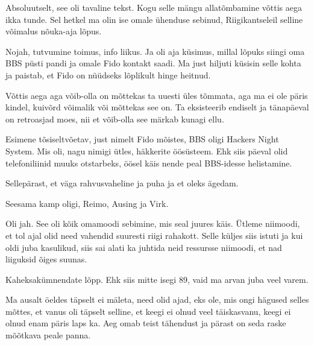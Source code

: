 
Absoluutselt, see oli tavaline tekst. Kogu selle mängu allatõmbamine võttis 
aega ikka tunde. Sel hetkel ma olin ise omale ühenduse sebinud, Riigikantseleil 
selline võimalus nõuka-aja lõpus. 

Nojah, tutvumine toimus, info liikus. Ja oli aja küsimus, millal lõpuks siingi  
oma BBS püsti pandi ja omale Fido kontakt saadi. Ma just hiljuti küsisin selle 
kohta ja paistab, et Fido on nüüdseks lõplikult hinge heitnud.


Võttis aega aga võib-olla on mõttekas ta uuesti üles tõmmata, aga ma ei ole 
päris kindel, kuivõrd võimalik või mõttekas see on. Ta eksisteerib endiselt ja 
tänapäeval on retroasjad moes, nii et võib-olla see märkab kunagi ellu.
                 

Esimene tõsiseltvõetav, just nimelt Fido mõistes, BBS oligi Hackers Night 
System. Mis oli, nagu 
nimigi ütles, häkkerite öösüsteem. Ehk siis päeval olid telefoniliinid muuks 
otstarbeks, öösel käis nende peal BBS-idesse helistamine. 


Sellepärast, et väga rahvusvaheline ja puha ja et oleks ägedam.

Seesama kamp oligi, Reimo, Ausing 
 ja Virk.
 
      

Oli jah. See oli kõik omamoodi sebimine, mis seal juures käis. Ütleme niimoodi, 
et tol ajal olid need vahendid suuresti riigi rahakott. Selle küljes siis 
istuti ja kui oldi juba kasulikud, siis sai alati ka juhtida neid ressursse 
niimoodi, et nad liiguksid õiges suunas. 


Kaheksakümnendate lõpp. Ehk siis mitte isegi 89, vaid ma arvan juba veel varem.
                 
Ma ausalt öeldes täpselt ei mäleta, need olid ajad, eks ole, mis ongi  hägused 
selles mõttes, et vanus oli täpselt selline, et keegi ei olnud veel  täiskasvanu, 
keegi ei olnud enam päris laps ka. Aeg omab teist tähendust ja pärast on seda 
raske mõõtkava peale panna.

